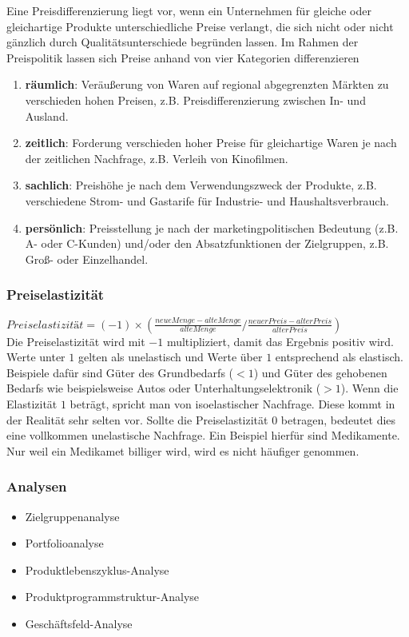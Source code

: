 Eine Preisdifferenzierung liegt vor, wenn ein Unternehmen für gleiche oder gleichartige Produkte unterschiedliche Preise verlangt, die sich nicht oder nicht gänzlich durch Qualitätsunterschiede begründen lassen. Im Rahmen der Preispolitik lassen sich Preise anhand von vier Kategorien differenzieren
\begin{enumerate}
	\item {\bf räumlich}: Veräußerung von Waren auf regional abgegrenzten Märkten zu verschieden hohen Preisen, z.B. Preisdifferenzierung  zwischen In- und Ausland.
	\item {\bf zeitlich}: Forderung verschieden hoher Preise für gleichartige Waren je nach der zeitlichen Nachfrage, z.B. Verleih von Kinofilmen.
	\item {\bf sachlich}: Preishöhe je nach dem Verwendungszweck der Produkte, z.B. verschiedene Strom- und Gastarife für Industrie- und Haushaltsverbrauch.
	\item {\bf persönlich}: Preisstellung je nach der marketingpolitischen Bedeutung (z.B. A- oder C-Kunden) und/oder den Absatzfunktionen der Zielgruppen, z.B. Groß- oder Einzelhandel.
\end{enumerate}

\subsubsection{Preiselastizität}

$Preiselastizität = (-1)\times(\frac{neue Menge - alte Menge}{alte Menge} / \frac{neuer Preis - alter Preis}{alter Preis})$\\
Die Preiselastizität wird mit $-1$ multipliziert, damit das Ergebnis positiv wird. Werte unter $1$ gelten als unelastisch und Werte über $1$ entsprechend als elastisch. Beispiele dafür sind Güter des Grundbedarfs ($<1$) und Güter des gehobenen Bedarfs wie beispielsweise Autos oder Unterhaltungselektronik ($>1$). Wenn die Elastizität $1$ beträgt, spricht man von isoelastischer Nachfrage. Diese kommt in der Realität sehr selten vor. Sollte die Preiselastizität $0$ betragen, bedeutet dies eine vollkommen unelastische Nachfrage. Ein Beispiel hierfür sind Medikamente. Nur weil ein Medikamet billiger wird, wird es nicht häufiger genommen.

\subsubsection{Analysen}

\begin{itemize}
	\item Zielgruppenanalyse
	\item Portfolioanalyse
	\item Produktlebenszyklus-Analyse
	\item Produktprogrammstruktur-Analyse
	\item Geschäftsfeld-Analyse
\end{itemize}



